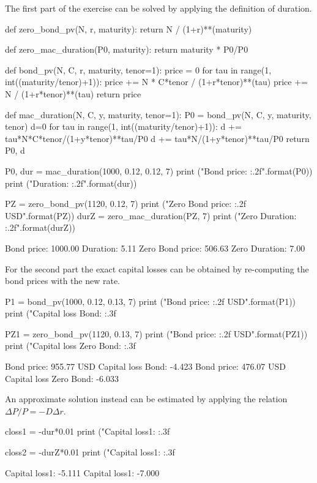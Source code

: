 \cprotEnv\begin{solution}
The first part of the exercise can be solved by applying the definition of duration.
\begin{ipython}
def zero_bond_pv(N, r, maturity):
    return N / (1+r)**(maturity)

def zero_mac_duration(P0, maturity): 
    return maturity * P0/P0 

def bond_pv(N, C, r, maturity, tenor=1):
    price = 0
    for tau in range(1, int((maturity/tenor)+1)):
        price += N * C*tenor / (1+r*tenor)**(tau)
    price += N / (1+r*tenor)**(tau)
    return price

def mac_duration(N, C, y, maturity, tenor=1): 
    P0 = bond_pv(N, C, y, maturity, tenor)
    d=0
    for tau in range(1, int((maturity/tenor)+1)):
        d += tau*N*C*tenor/(1+y*tenor)**tau/P0
    d += tau*N/(1+y*tenor)**tau/P0 
    return P0, d

P0, dur = mac_duration(1000, 0.12, 0.12, 7)
print ("Bond price: {:.2f}".format(P0))
print ("Duration: {:.2f}".format(dur))

PZ = zero_bond_pv(1120, 0.12, 7) 
print ("Zero Bond price: {:.2f} USD".format(PZ))
durZ = zero_mac_duration(PZ, 7)
print ("Zero Duration: {:.2f}".format(durZ))
\end{ipython}
\begin{ioutput}
Bond price: 1000.00
Duration: 5.11
Zero Bond price: 506.63
Zero Duration: 7.00
\end{ioutput}

For the second part the exact capital losses can be obtained by re-computing the bond prices with the new rate.

\begin{ipython}
P1 = bond_pv(1000, 0.12, 0.13, 7)
print ("Bond price: {:.2f} USD".format(P1))
print ("Capital loss Bond: {:.3f}%

PZ1 = zero_bond_pv(1120, 0.13, 7) 
print ("Bond price: {:.2f} USD".format(PZ1))
print ("Capital loss Zero Bond: {:.3f}%
\end{ipython}
\begin{ioutput}
Bond price: 955.77 USD
Capital loss Bond: -4.423%
Bond price: 476.07 USD
Capital loss Zero Bond: -6.033%
\end{ioutput}

An approximate solution instead can be estimated by applying the relation $\Delta P/P = -D\Delta r$.
\begin{ipython}
closs1 = -dur*0.01
print ("Capital loss1: {:.3f}%

closs2 = -durZ*0.01
print ("Capital loss1: {:.3f}%
\end{ipython}
\begin{ioutput}
Capital loss1: -5.111%
Capital loss1: -7.000%
\end{ioutput}
\end{solution}

